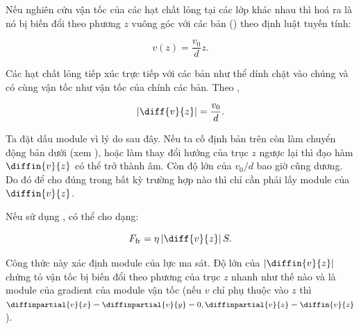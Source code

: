 Nếu nghiên cứu vận tốc của các hạt chất lỏng tại các lớp khác nhau thì hoá ra là nó bị biến đổi theo phương $z$ vuông góc với các bản () theo định luật tuyến tính:

\begin{equation}\label{eq:9_10}
	v(z) = \frac{v_0}{d}z.
\end{equation}
\noindent


Các hạt chất lỏng tiếp xúc trực tiếp với các bản như thể dính chặt vào chúng và có cùng vận tốc như vận tốc của chính các bản. Theo ,

\begin{equation}\label{eq:9_11}
	\left|\diff{v}{z}\right| = \frac{v_0}{d}.
\end{equation}
\noindent


Ta đặt dấu module vì lý do sau đây. Nếu ta cố định bản trên còn làm chuyển động bản dưới (xem ), hoặc làm thay đổi hướng của trục $z$ ngược lại thì đạo hàm $\diffin{v}{z}$ có thể trở thành âm. Còn độ lớn của $v_0/d$ bao giờ cũng dương. Do đó để cho  đúng trong bất kỳ trường hợp nào thì chỉ cần phải lấy module của $\diffin{v}{z}$.

Nếu sử dụng , có thể cho  dạng:

\begin{equation}\label{eq:9_12}
	F_{\text{fr}} = \eta \left|\diff{v}{z}\right| S.
\end{equation}


Công thức này xác định module của lực ma sát. Độ lớn của $|\diffin{v}{z}|$ chứng tỏ vận tốc bị biến đổi theo phương của trục $z$ nhanh như thế nào và là module của gradient của module vận tốc (nếu $v$ chỉ phụ thuộc vào $z$ thì $\diffinpartial{v}{x}=\diffinpartial{v}{y}=0, \diffinpartial{v}{z}=\diffin{v}{z}$).

